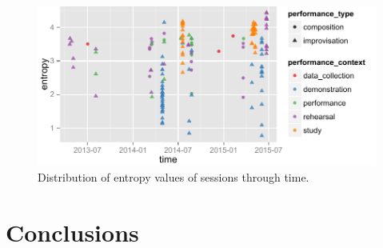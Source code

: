 \documentclass{sigchi}
\begin{document}
\begin{figure}
  \centering
  \includegraphics[width=\linewidth]{figures/entropy-through-time}
  \caption{Distribution of entropy values of sessions through time.
    \label{fig:entropy-through-time}}
\end{figure}


\section{Conclusions}





\end{document}
